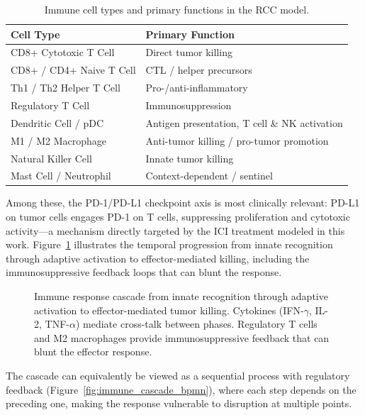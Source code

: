 \begin{table}[htbp]
\centering
\caption{Immune cell types and primary functions in the RCC model.}
\label{tab:immune_cells}
{\footnotesize
\begin{tabular}{@{}ll@{}}
\toprule
\textbf{Cell Type} & \textbf{Primary Function} \\
\midrule
CD8+ Cytotoxic T Cell & Direct tumor killing \\
CD8+ / CD4+ Naive T Cell & CTL / helper precursors \\
Th1 / Th2 Helper T Cell & Pro-/anti-inflammatory \\
Regulatory T Cell & Immunosuppression \\
Dendritic Cell / pDC & Antigen presentation, T cell \& NK activation \\
M1 / M2 Macrophage & Anti-tumor killing / pro-tumor promotion \\
Natural Killer Cell & Innate tumor killing \\
Mast Cell / Neutrophil & Context-dependent / sentinel \\
\bottomrule
\end{tabular}
}
\end{table}

Among these, the PD-1/PD-L1 checkpoint axis is most clinically relevant: PD-L1 on tumor cells engages PD-1 on T cells, suppressing proliferation and cytotoxic activity---a mechanism directly targeted by the ICI treatment modeled in this work. Figure~\ref{fig:immune_response_cascade} illustrates the temporal progression from innate recognition through adaptive activation to effector-mediated killing, including the immunosuppressive feedback loops that can blunt the response.

\begin{figure}[htbp]
\centering
{}
\caption{Immune response cascade from innate recognition through adaptive activation to effector-mediated tumor killing. Cytokines (IFN-$\gamma$, IL-2, TNF-$\alpha$) mediate cross-talk between phases. Regulatory T cells and M2 macrophages provide immunosuppressive feedback that can blunt the effector response.}
\label{fig:immune_response_cascade}
\end{figure}

The cascade can equivalently be viewed as a sequential process with regulatory feedback (Figure~\ref{fig:immune_cascade_bpmn}), where each step depends on the preceding one, making the response vulnerable to disruption at multiple points.

